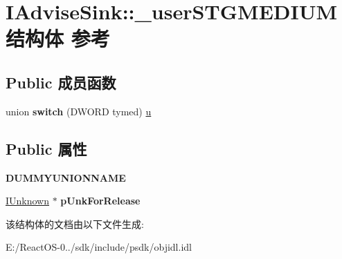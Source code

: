 \hypertarget{struct_i_advise_sink_1_1__user_s_t_g_m_e_d_i_u_m}{}\section{I\+Advise\+Sink\+:\+:\+\_\+user\+S\+T\+G\+M\+E\+D\+I\+U\+M结构体 参考}
\label{struct_i_advise_sink_1_1__user_s_t_g_m_e_d_i_u_m}
\subsection*{Public 成员函数}
\begin{DoxyCompactItemize}
\item 
\mbox{\label{struct_i_advise_sink_1_1__user_s_t_g_m_e_d_i_u_m_a918519bc56e3e473848df344b0d70cd2}} 
union {\bfseries switch} (D\+W\+O\+RD tymed) \hyperlink{union_i_advise_sink_1_1u}{u}
\end{DoxyCompactItemize}
\subsection*{Public 属性}
\begin{DoxyCompactItemize}
\item 
\mbox{\label{struct_i_advise_sink_1_1__user_s_t_g_m_e_d_i_u_m_a571291d899151fb18a0d4482a1e4bbd3}} 
{\bfseries D\+U\+M\+M\+Y\+U\+N\+I\+O\+N\+N\+A\+ME}
\item 
\mbox{\label{struct_i_advise_sink_1_1__user_s_t_g_m_e_d_i_u_m_a2f9b040904be7b5da0ffffd1628cc244}} 
\hyperlink{interface_i_unknown}{I\+Unknown} $\ast$ {\bfseries p\+Unk\+For\+Release}
\end{DoxyCompactItemize}


该结构体的文档由以下文件生成\+:\begin{DoxyCompactItemize}
\item 
E\+:/\+React\+O\+S-\/0../sdk/include/psdk/objidl.\+idl\end{DoxyCompactItemize}
